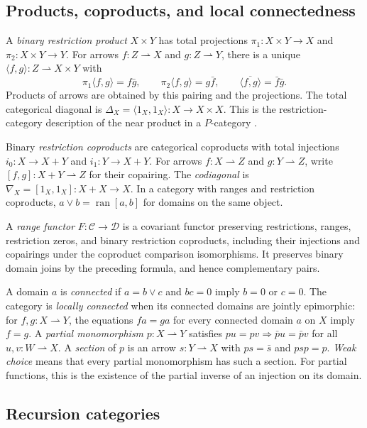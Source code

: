 \documentclass[11pt]{article}
\newcommand{\ran}{\operatorname{ran}}
\begin{document}
\subsection{Products, coproducts, and local connectedness}

A \emph{binary restriction product} $X\times Y$ has total
projections $\pi_1:X\times Y\to X$ and $\pi_2:X\times Y\to Y$.
For arrows $f:Z\rightharpoonup X$ and $g:Z\rightharpoonup Y$,
there is a unique $\langle f,g\rangle:Z\rightharpoonup X\times Y$
with
\[
 \pi_1\langle f,g\rangle=f\bar g,\qquad
 \pi_2\langle f,g\rangle=g\bar f,\qquad
 \overline{\langle f,g\rangle}=\bar f\bar g.
\]
Products of arrows are obtained by this pairing and the projections.
The total categorical diagonal is
$\Delta_X=\langle1_X,1_X\rangle:X\to X\times X$.
This is the restriction-category description of the near product
in a $P$-category \cite{Rosolini,CockettLack}.

Binary \emph{restriction coproducts} are categorical coproducts with
total injections $i_0:X\to X+Y$ and $i_1:Y\to X+Y$.
For arrows $f:X\rightharpoonup Z$ and $g:Y\rightharpoonup Z$,
write $[f,g]:X+Y\rightharpoonup Z$ for their copairing.
The \emph{codiagonal} is
$\nabla_X=[1_X,1_X]:X+X\to X$.
In a category with ranges and restriction coproducts,
$a\vee b=\ran[a,b]$ for domains on the same object.

A \emph{range functor} $F:\mathcal C\to\mathcal D$ is a covariant
functor preserving restrictions, ranges, restriction zeros, and binary
restriction coproducts, including their injections and copairings
under the coproduct comparison isomorphisms. It preserves binary
domain joins by the preceding formula, and hence complementary pairs.

A domain $a$ is \emph{connected} if $a=b\vee c$ and $bc=0$
imply $b=0$ or $c=0$. The category is \emph{locally connected}
when its connected domains are jointly epimorphic: for
$f,g:X\rightharpoonup Y$, the equations $fa=ga$ for every connected
domain $a$ on $X$ imply $f=g$.
A \emph{partial monomorphism} $p:X\rightharpoonup Y$ satisfies
$pu=pv\Rightarrow\bar p u=\bar p v$ for all
$u,v:W\rightharpoonup X$.
A \emph{section} of $p$ is an arrow $s:Y\rightharpoonup X$
with $ps=\bar s$ and $psp=p$.
\emph{Weak choice} means that every partial monomorphism has such
a section. For partial functions, this is the existence of the
partial inverse of an injection on its domain.

\subsection{Recursion categories}
\end{document}
